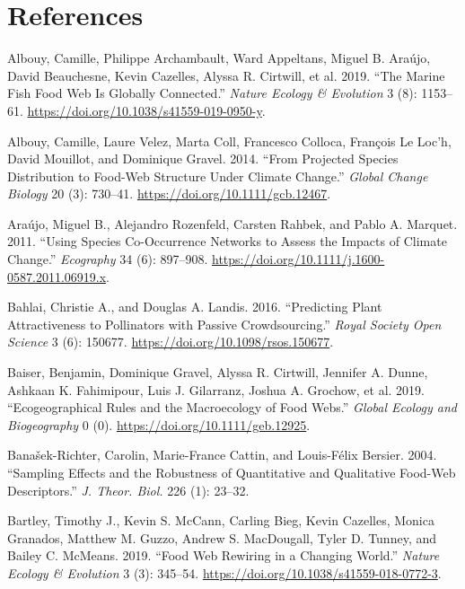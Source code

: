 \documentclass[11pt]{article}
\begin{document}
\hypertarget{references}{%
\section*{References}\label{references}}

\hypertarget{refs}{}
\leavevmode\hypertarget{ref-AlboArch19}{}%
Albouy, Camille, Philippe Archambault, Ward Appeltans, Miguel B. Araújo,
David Beauchesne, Kevin Cazelles, Alyssa R. Cirtwill, et al. 2019. ``The
Marine Fish Food Web Is Globally Connected.'' \emph{Nature Ecology \&
Evolution} 3 (8): 1153--61.
\url{https://doi.org/10.1038/s41559-019-0950-y}.

\leavevmode\hypertarget{ref-AlboVele14}{}%
Albouy, Camille, Laure Velez, Marta Coll, Francesco Colloca, François Le
Loc'h, David Mouillot, and Dominique Gravel. 2014. ``From Projected
Species Distribution to Food-Web Structure Under Climate Change.''
\emph{Global Change Biology} 20 (3): 730--41.
\url{https://doi.org/10.1111/gcb.12467}.

\leavevmode\hypertarget{ref-ArauRoze11}{}%
Araújo, Miguel B., Alejandro Rozenfeld, Carsten Rahbek, and Pablo A.
Marquet. 2011. ``Using Species Co-Occurrence Networks to Assess the
Impacts of Climate Change.'' \emph{Ecography} 34 (6): 897--908.
\url{https://doi.org/10.1111/j.1600-0587.2011.06919.x}.

\leavevmode\hypertarget{ref-BahlLand16}{}%
Bahlai, Christie A., and Douglas A. Landis. 2016. ``Predicting Plant
Attractiveness to Pollinators with Passive Crowdsourcing.'' \emph{Royal
Society Open Science} 3 (6): 150677.
\url{https://doi.org/10.1098/rsos.150677}.

\leavevmode\hypertarget{ref-BaisGrav19}{}%
Baiser, Benjamin, Dominique Gravel, Alyssa R. Cirtwill, Jennifer A.
Dunne, Ashkaan K. Fahimipour, Luis J. Gilarranz, Joshua A. Grochow, et
al. 2019. ``Ecogeographical Rules and the Macroecology of Food Webs.''
\emph{Global Ecology and Biogeography} 0 (0).
\url{https://doi.org/10.1111/geb.12925}.

\leavevmode\hypertarget{ref-BanaCatt04}{}%
Banašek-Richter, Carolin, Marie-France Cattin, and Louis-Félix Bersier.
2004. ``Sampling Effects and the Robustness of Quantitative and
Qualitative Food-Web Descriptors.'' \emph{J. Theor. Biol.} 226 (1):
23--32.

\leavevmode\hypertarget{ref-BartMcCa19}{}%
Bartley, Timothy J., Kevin S. McCann, Carling Bieg, Kevin Cazelles,
Monica Granados, Matthew M. Guzzo, Andrew S. MacDougall, Tyler D.
Tunney, and Bailey C. McMeans. 2019. ``Food Web Rewiring in a Changing
World.'' \emph{Nature Ecology \& Evolution} 3 (3): 345--54.
\url{https://doi.org/10.1038/s41559-018-0772-3}.
\end{document}
